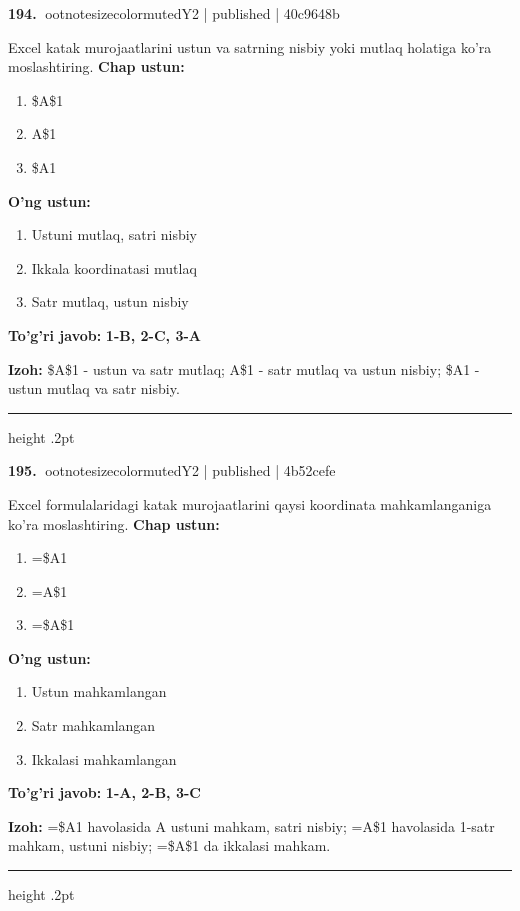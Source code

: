 \documentclass[10pt,a4paper]{article}
\begin{document}
\textbf{\color{ink}194.} {ootnotesizecolor{muted}Y2 | published | 40c9648b}
\par
Excel katak murojaatlarini ustun va satrning nisbiy yoki mutlaq holatiga ko'ra moslashtiring.
\textbf{Chap ustun:}\begin{enumerate}[label=\arabic*),leftmargin=9mm]
\item \$A\$1
\item A\$1
\item \$A1
\end{enumerate}
\textbf{O'ng ustun:}\begin{enumerate}[label=\Alph*),leftmargin=9mm]
\item Ustuni mutlaq, satri nisbiy
\item Ikkala koordinatasi mutlaq
\item Satr mutlaq, ustun nisbiy
\end{enumerate}
\begin{tcolorbox}[enhanced,breakable,colback=teal!4,colframe=teal!55!black,boxrule=0.45pt,arc=1.2mm,left=2.8mm,right=2.8mm,top=2mm,bottom=2mm]
\textbf{\color{teal}To'g'ri javob:} \textbf{1-B, 2-C, 3-A}
\par\smallskip
\textbf{Izoh:} \$A\$1 - ustun va satr mutlaq; A\$1 - satr mutlaq va ustun nisbiy; \$A1 - ustun mutlaq va satr nisbiy.
\end{tcolorbox}
\vspace{2mm}\hrule height .2pt\vspace{2mm}

\textbf{\color{ink}195.} {ootnotesizecolor{muted}Y2 | published | 4b52cefe}
\par
Excel formulalaridagi katak murojaatlarini qaysi koordinata mahkamlanganiga ko'ra moslashtiring.
\textbf{Chap ustun:}\begin{enumerate}[label=\arabic*),leftmargin=9mm]
\item =\$A1
\item =A\$1
\item =\$A\$1
\end{enumerate}
\textbf{O'ng ustun:}\begin{enumerate}[label=\Alph*),leftmargin=9mm]
\item Ustun mahkamlangan
\item Satr mahkamlangan
\item Ikkalasi mahkamlangan
\end{enumerate}
\begin{tcolorbox}[enhanced,breakable,colback=teal!4,colframe=teal!55!black,boxrule=0.45pt,arc=1.2mm,left=2.8mm,right=2.8mm,top=2mm,bottom=2mm]
\textbf{\color{teal}To'g'ri javob:} \textbf{1-A, 2-B, 3-C}
\par\smallskip
\textbf{Izoh:} =\$A1 havolasida A ustuni mahkam, satri nisbiy; =A\$1 havolasida 1-satr mahkam, ustuni nisbiy; =\$A\$1 da ikkalasi mahkam.
\end{tcolorbox}
\vspace{2mm}\hrule height .2pt\vspace{2mm}
\end{document}
